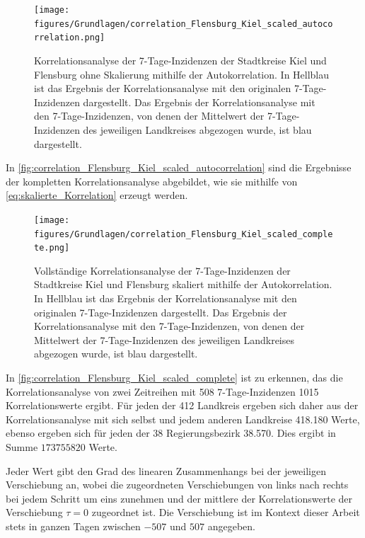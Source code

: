 \begin{figure}[H]
    \centering
    \texttt{[image: figures/Grundlagen/correlation\_Flensburg\_Kiel\_scaled\_autocorrelation.png]}
    \caption{Korrelationsanalyse der 7-Tage-Inzidenzen der Stadtkreise Kiel und Flensburg ohne Skalierung mithilfe der Autokorrelation.
    In Hellblau ist das Ergebnis der Korrelationsanalyse mit den originalen 7-Tage-Inzidenzen dargestellt. Das Ergebnis der Korrelationsanalyse mit den 7-Tage-Inzidenzen, von denen der Mittelwert der 7-Tage-Inzidenzen des jeweiligen Landkreises abgezogen wurde, ist blau dargestellt.}
    \label{fig:correlation_Flensburg_Kiel_scaled_autocorrelation}
\end{figure}
In \autoref{fig:correlation_Flensburg_Kiel_scaled_autocorrelation} sind die Ergebnisse der kompletten Korrelationsanalyse abgebildet, wie sie mithilfe von \autoref{eq:skalierte_Korrelation} erzeugt werden.
\begin{figure}[H]
    \centering
    \texttt{[image: figures/Grundlagen/correlation\_Flensburg\_Kiel\_scaled\_complete.png]}
    \caption{Vollständige Korrelationsanalyse der 7-Tage-Inzidenzen der Stadtkreise Kiel und Flensburg skaliert mithilfe der Autokorrelation.
    In Hellblau ist das Ergebnis der Korrelationsanalyse mit den originalen 7-Tage-Inzidenzen dargestellt. Das Ergebnis der Korrelationsanalyse mit den 7-Tage-Inzidenzen, von denen der Mittelwert der 7-Tage-Inzidenzen des jeweiligen Landkreises abgezogen wurde, ist blau dargestellt.}
    \label{fig:correlation_Flensburg_Kiel_scaled_complete}
\end{figure}

In \autoref{fig:correlation_Flensburg_Kiel_scaled_complete} ist zu erkennen, das die Korrelationsanalyse von zwei Zeitreihen mit 508 7-Tage-Inzidenzen 1015 Korrelationswerte ergibt.
Für jeden der 412 Landkreis ergeben sich daher aus der Korrelationsanalyse mit sich selbst und jedem anderen Landkreise 418.180 Werte, ebenso ergeben sich für jeden der 38 Regierungsbezirk 38.570. Dies ergibt in Summe $
173 755 820$ Werte.

Jeder Wert gibt den Grad des linearen Zusammenhangs bei der jeweiligen Verschiebung an, wobei die zugeordneten Verschiebungen von links nach rechts bei jedem Schritt um eins zunehmen und der mittlere der Korrelationswerte der Verschiebung $\tau = 0$ zugeordnet ist. Die Verschiebung ist im Kontext dieser Arbeit stets in ganzen Tagen zwischen $-507$ und $507$ angegeben. 

